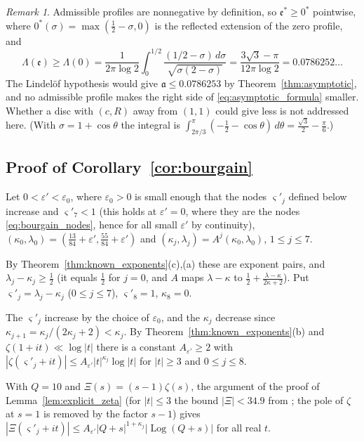 \documentclass[11pt,a4paper]{article}
\makeatletter
\numberwithin{equation}{section}
\DeclareRobustCommand{\CGref}[1]{\ref{#1}}
\DeclareRobustCommand{\CGeqref}[1]{\eqref{#1}}
\DeclareRobustCommand{\CGcite}[2][]{\if\relax\detokenize{#1}\relax\cite{#2}\else\cite[#1]{#2}\fi}
\let\CG@origref\ref
\let\CG@origeqref\eqref
\newcommand{\CG@gettip}[1]{\@ifundefined{CGTip@#1}{#1}{\csname CGTip@#1\endcsname}}
\newcommand{\CG@getbib}[1]{\@ifundefined{CGBib@#1}{#1}{\csname CGBib@#1\endcsname}}
\DeclareRobustCommand{\CGref}[1]{\pdftooltip{\CG@origref{#1}}{\CG@gettip{#1}}}
\DeclareRobustCommand{\CGeqref}[1]{\pdftooltip{\CG@origeqref{#1}}{\CG@gettip{#1}}}
\DeclareRobustCommand{\CGcite}[2][]{\pdftooltip{\if\relax\detokenize{#1}\relax\cite{#2}\else\cite[#1]{#2}\fi}{\CG@getbib{#2}}}
\theoremstyle{definition}
\theoremstyle{remark}
\newtheorem{remark}[theorem]{Remark}
\makeatother
\begin{document}
\begin{remark}\label{rem:lindelof}
Admissible profiles are nonnegative by definition, so $\mathfrak e^*\ge0^*$ pointwise, where $0^*(\sigma)=\max(\frac12-\sigma,0)$ is the reflected extension of the zero profile, and
\begin{equation}
\Lambda(\mathfrak e)\ge\Lambda(0)=\frac1{2\pi\log2}\int_0^{1/2}\frac{(1/2-\sigma)\,d\sigma}{\sqrt{\sigma(2-\sigma)}}=\frac{3\sqrt3-\pi}{12\pi\log2}=0.0786252\ldots
\label{eq:disp_17}
\end{equation}
The Lindel\"of hypothesis would give $\mathfrak a\le0.0786253$ by Theorem~\CGref{thm:asymptotic}, and no admissible profile makes the right side of \CGeqref{eq:asymptotic_formula} smaller. Whether a disc with $(c,R)$ away from $(1,1)$ could give less is not addressed here.
(With $\sigma=1+\cos\theta$ the integral is $\int_{2\pi/3}^\pi(-\frac12-\cos\theta)\,d\theta=\frac{\sqrt3}2-\frac\pi6$.)
\end{remark}

\subsection{Proof of Corollary~\ref{cor:bourgain}}\label{subsec:proof_bourgain}
Let $0<\varepsilon'<\varepsilon_0$, where $\varepsilon_0>0$ is small enough that the nodes $\varsigma'_j$ defined below increase and $\varsigma'_7<1$ (this holds at $\varepsilon'=0$, where they are the nodes \CGeqref{eq:bourgain_nodes}, hence for all small $\varepsilon'$ by continuity), $(\kappa_0,\lambda_0)=(\frac{13}{84}+\varepsilon',\frac{55}{84}+\varepsilon')$ and $(\kappa_j,\lambda_j)=A^j(\kappa_0,\lambda_0)$, $1\le j\le7$.

By Theorem~\CGref{thm:known_exponents}(c),(a) these are exponent pairs, and $\lambda_j-\kappa_j\ge\frac12$ (it equals $\frac12$ for $j=0$, and $A$ maps $\lambda-\kappa$ to $\frac12+\frac{\lambda-\kappa}{2\kappa+2}$). Put $\varsigma'_j=\lambda_j-\kappa_j$ ($0\le j\le7$), $\varsigma'_8=1$, $\kappa_8=0$.

The $\varsigma'_j$ increase by the choice of $\varepsilon_0$, and the $\kappa_j$ decrease since $\kappa_{j+1}=\kappa_j/(2\kappa_j+2)<\kappa_j$. By Theorem~\CGref{thm:known_exponents}(b) and $\zeta(1+it)\ll\log|t|$ there is a constant $A_{\varepsilon'}\ge2$ with $|\zeta(\varsigma'_j+it)|\le A_{\varepsilon'}|t|^{\kappa_j}\log|t|$ for $|t|\ge3$ and $0\le j\le8$.

With $Q=10$ and $\Xi(s)=(s-1)\zeta(s)$, the argument of the proof of Lemma~\CGref{lem:explicit_zeta} (for $|t|\le3$ the bound $|\Xi|<34.9$ from \CGcite[(2.1.4)]{Titchmarsh1986}; the pole of $\zeta$ at $s=1$ is removed by the factor $s-1$) gives $|\Xi(\varsigma'_j+it)|\le A_{\varepsilon'}|Q+s|^{1+\kappa_j}|\operatorname{Log}(Q+s)|$ for all real $t$.
\end{document}
